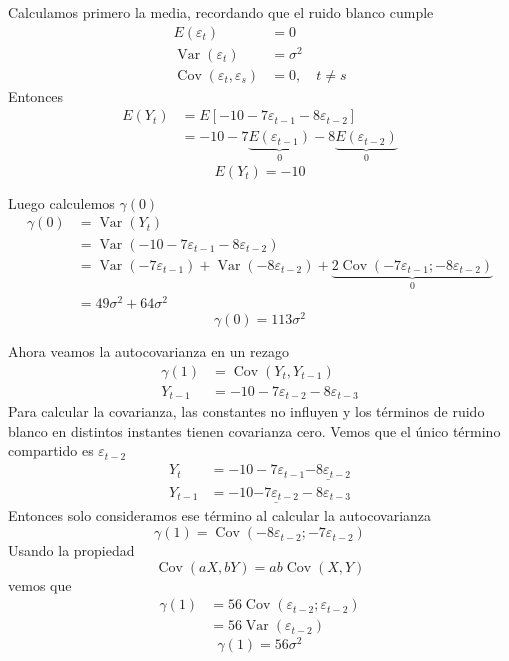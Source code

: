 \documentclass[9pt]{extarticle}
\begin{document}
Calculamos primero la media, recordando que el ruido blanco cumple
\begin{align*}
E(\varepsilon_t) &= 0\\
\operatorname{Var}(\varepsilon_t) &= \sigma^2\\
\operatorname{Cov}(\varepsilon_t, \varepsilon_s) &= 0, \quad t \neq s
\end{align*}
Entonces
\begin{align*}
E(Y_t) &= E[-10 - 7\varepsilon_{t-1} - 8\varepsilon_{t-2}]\\
&= -10 - 7\underbrace{E(\varepsilon_{t-1})}_{0} - 8\underbrace{E(\varepsilon_{t-2})}_{0}
\end{align*}
\[
\boxed{E(Y_t) = -10}
\]

Luego calculemos $\gamma(0)$
\begin{align*}
\gamma(0) &= \operatorname{Var}(Y_t)\\
&= \operatorname{Var}(-10 - 7\varepsilon_{t-1} - 8\varepsilon_{t-2})\\
&= \operatorname{Var}(-7\varepsilon_{t-1}) + \operatorname{Var}(-8\varepsilon_{t-2}) + \underbrace{2\operatorname{Cov}(-7\varepsilon_{t-1}; -8\varepsilon_{t-2})}_{0}\\
&= 49\sigma^2 + 64\sigma^2
\end{align*}
\[
\boxed{\gamma(0) = 113\sigma^2}
\]

Ahora veamos la autocovarianza en un rezago
\begin{align*}
\gamma(1) &= \operatorname{Cov}(Y_t, Y_{t-1})\\
Y_{t-1} &= -10 - 7\varepsilon_{t-2} - 8\varepsilon_{t-3}
\end{align*}
Para calcular la covarianza, las constantes no influyen y los términos de ruido blanco en distintos instantes tienen covarianza cero.
Vemos que el único término compartido es $\varepsilon_{t-2}$
\begin{align*}
Y_t &= -10 - 7\varepsilon_{t-1} \underline{- 8\varepsilon_{t-2}}\\
Y_{t-1} &= -10 \underline{- 7\varepsilon_{t-2}} - 8\varepsilon_{t-3}
\end{align*}
Entonces solo consideramos ese término al calcular la autocovarianza
\[
\gamma(1) = \operatorname{Cov}(-8\varepsilon_{t-2}; -7\varepsilon_{t-2})
\]
Usando la propiedad
\[
\operatorname{Cov}(aX, bY) = ab\operatorname{Cov}(X, Y)
\]
vemos que
\begin{align*}
\gamma(1) &= 56\operatorname{Cov}(\varepsilon_{t-2}; \varepsilon_{t-2})\\
&= 56\operatorname{Var}(\varepsilon_{t-2})
\end{align*}
\[
\boxed{\gamma(1) = 56\sigma^2}
\]
\end{document}

